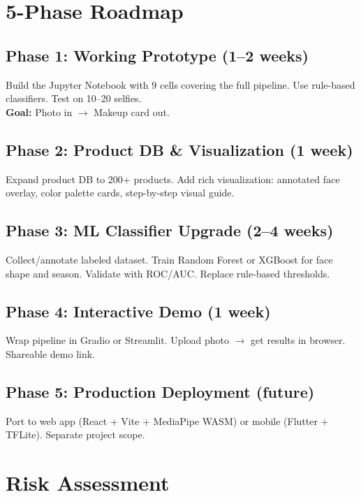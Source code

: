 \documentclass[12pt,a4paper]{article}
\begin{document}
\section{5-Phase Roadmap}

\subsection{Phase 1: Working Prototype (1--2 weeks)}
Build the Jupyter Notebook with 9 cells covering the full pipeline. Use rule-based classifiers. Test on 10--20 selfies.\\
\textbf{Goal:} Photo in $\to$ Makeup card out.

\subsection{Phase 2: Product DB \& Visualization (1 week)}
Expand product DB to 200+ products. Add rich visualization: annotated face overlay, color palette cards, step-by-step visual guide.

\subsection{Phase 3: ML Classifier Upgrade (2--4 weeks)}
Collect/annotate labeled dataset. Train Random Forest or XGBoost for face shape and season. Validate with ROC/AUC. Replace rule-based thresholds.

\subsection{Phase 4: Interactive Demo (1 week)}
Wrap pipeline in Gradio or Streamlit. Upload photo $\to$ get results in browser. Shareable demo link.

\subsection{Phase 5: Production Deployment (future)}
Port to web app (React + Vite + MediaPipe WASM) or mobile (Flutter + TFLite). Separate project scope.


\section{Risk Assessment}
\end{document}
